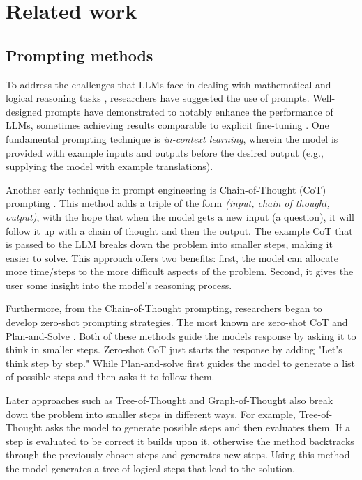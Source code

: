 \documentclass[fleqn,moreauthors,10pt]{ds_report}
\begin{document}

\section*{Related work}

\subsection*{Prompting methods}
To address the challenges that LLMs face in dealing with mathematical and logical reasoning tasks \cite{llm_bad_at_math}, researchers have suggested the use of prompts. Well-designed prompts have demonstrated to notably enhance the performance of LLMs, sometimes achieving results comparable to explicit fine-tuning \cite{few_shot_gpt3}. One fundamental prompting technique is \textit{in-context learning}, wherein the model is provided with example inputs and outputs before the desired output (e.g., supplying the model with example translations).

Another early technique in prompt engineering is Chain-of-Thought (CoT) prompting \cite{CoT}. This method adds a triple of the form \textit{(input, chain of thought, output)}, with the hope that when the model gets a new input (a question), it will follow it up with a chain of thought and then the output. The example CoT that is passed to the LLM breaks down the problem into smaller steps, making it easier to solve. This approach offers two benefits: first, the model can allocate more time/steps to the more difficult aspects of the problem. Second, it gives the user some insight into the model's reasoning process. 

Furthermore, from the Chain-of-Thought prompting, researchers began to develop zero-shot prompting strategies. The most known are zero-shot CoT \cite{kojima2023large} and Plan-and-Solve \cite{wang2023planandsolve}. Both of these methods guide the models response by asking it to think in smaller steps. Zero-shot CoT just starts the response by adding "Let's think step by step." While Plan-and-solve first guides the model to generate a list of possible steps and then asks it to follow them.

Later approaches such as Tree-of-Thought \cite{yao2023tree} and Graph-of-Thought \cite{besta2024graph} also break down the problem into smaller steps in different ways. For example, Tree-of-Thought asks the model to generate possible steps and then evaluates them. If a step is evaluated to be correct it builds upon it, otherwise the method backtracks through the previously chosen steps and generates new steps. Using this method the model generates a tree of logical steps that lead to the solution. 
\end{document}
